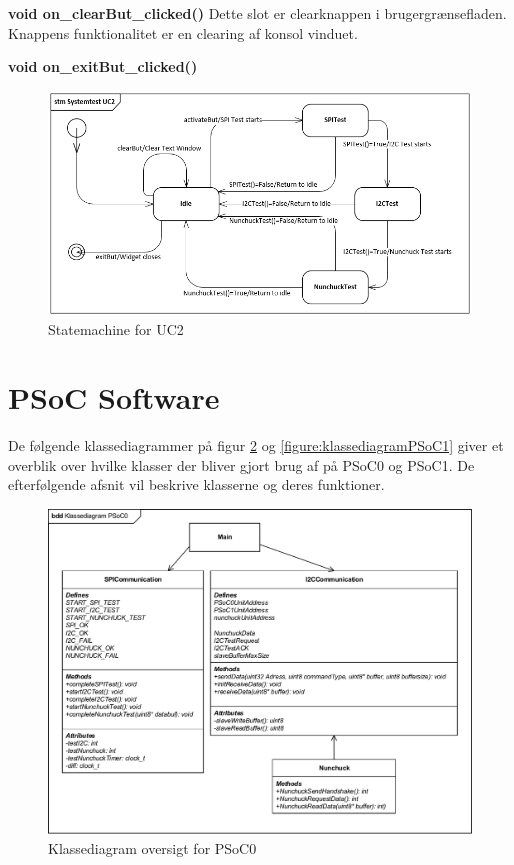 \noindent\textbf{void on_clearBut_clicked()} \newline
Dette slot er clearknappen i brugergrænsefladen. Knappens funktionalitet er en clearing af konsol vinduet. \newline

\noindent\textbf{void on_exitBut_clicked()} \newline

\begin{figure}[H]
	\centering
	\includegraphics[width=\textwidth]{DesignOgImplementering/images/StateMachineGUIUC2}
	\caption{Statemachine for UC2}
	\label{fig:stmGUI}
\end{figure}


\section{PSoC Software}

De følgende klassediagrammer på figur \ref{figure:klassediagramPSoC0} og \ref{figure:klassediagramPSoC1} giver et overblik over hvilke klasser der bliver gjort brug af på PSoC0 og PSoC1. De efterfølgende afsnit vil beskrive klasserne og deres funktioner.

\begin{figure}[H]
	\centering
	\includegraphics[width=.7\textwidth]{DesignOgImplementering/images/PSoC0KlassediagramOversigt}
	\caption{Klassediagram oversigt for PSoC0}
	\label{figure:klassediagramPSoC0}
\end{figure}


